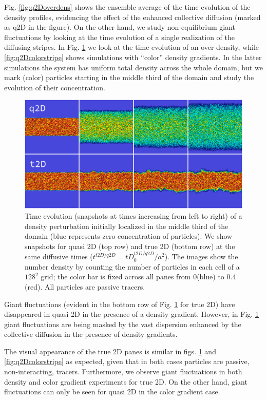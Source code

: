 \documentclass[twoside,openright,titlepage,numbers=noenddot,%
headinclude,footinclude,cleardoublepage=empty,abstract=on,
BCOR=5mm,fontsize=11pt, dvipsnames, paper=b5
]{scrreprt}
\begin{document}
Fig. \ref{fig:q2Doverdens} shows the ensemble average of the time evolution of the density profiles, evidencing the effect of the enhanced collective diffusion (marked as q2D in the figure).
On the other hand, we study non-equilibrium giant fluctuations by looking at the time evolution of a single realization of the diffusing stripes. In Fig. \ref{fig:q2Dstripes} we look at the time evolution of an over-density, while \ref{fig:q2Dcolorstripe} shows simulations with ``color'' density gradients. In the latter simulations the system has uniform total density across the whole domain, but we mark (color) particles starting in the middle third of the domain and study the evolution of their concentration.
\begin{figure}[H]
  \centering
  \includegraphics[width=\linewidth]{gfx/q2Dstripes}
  \caption[ ]{Time evolution (snapshots at times increasing from left to right) of a density perturbation initially localized in the middle third of the domain (blue represents zero concentration of particles). We show snapshots for quasi 2D (top row) and true 2D (bottom row) at the same diffusive times ($t^{t2D/q2D}= tD_0^{t2D/q2D}/a^2$). The images show the number density by counting the number of particles in each cell of a $128^2$ grid; the color bar is fixed across all panes from 0(blue) to 0.4 (red). All particles are passive tracers.}
  \label{fig:q2Dstripes}
\end{figure}
Giant fluctuations (evident in the bottom row of Fig. \ref{fig:q2Dstripes} for true 2D) have disappeared in quasi 2D in the presence of a density gradient. However, in Fig. \ref{fig:q2Dstripes} giant fluctuations are being masked by the vast dispersion enhanced by the collective diffusion in the presence of density gradients.

The visual appearance of the true 2D panes is similar in figs. \ref{fig:q2Dstripes} and \ref{fig:q2Dcolorstripe} as expected, given that in both cases particles are passive, non-interacting, tracers. Furthermore, we observe giant fluctuations in both density and color gradient experiments for true 2D. On the other hand, giant fluctuations can only be seen for quasi 2D in the color gradient case.
\end{document}
